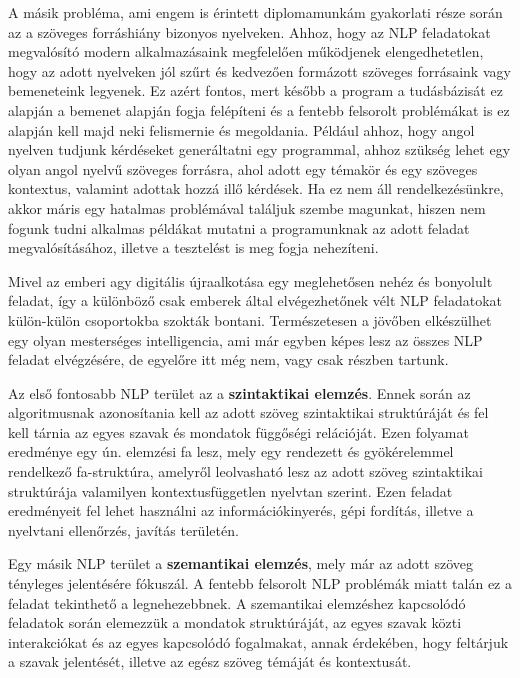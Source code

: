 A másik probléma, ami engem is érintett diplomamunkám gyakorlati része során az a szöveges forráshiány bizonyos nyelveken. Ahhoz, hogy az NLP feladatokat megvalósító modern alkalmazásaink megfelelően működjenek elengedhetetlen, hogy az adott nyelveken jól szűrt és kedvezően formázott szöveges forrásaink vagy bemeneteink legyenek. Ez azért fontos, mert később a program a tudásbázisát ez alapján a bemenet alapján fogja felépíteni és a fentebb felsorolt problémákat is ez alapján kell majd neki felismernie és megoldania. Például ahhoz, hogy angol nyelven tudjunk kérdéseket generáltatni egy programmal, ahhoz szükség lehet egy olyan angol nyelvű szöveges forrásra, ahol adott egy témakör és egy szöveges kontextus, valamint adottak hozzá illő kérdések. Ha ez nem áll rendelkezésünkre, akkor máris egy hatalmas problémával találjuk szembe magunkat, hiszen nem fogunk tudni alkalmas példákat mutatni a programunknak az adott feladat megvalósításához, illetve a tesztelést is meg fogja nehezíteni.


Mivel az emberi agy digitális újraalkotása egy meglehetősen nehéz és bonyolult feladat, így a különböző csak emberek által elvégezhetőnek vélt NLP feladatokat külön-külön csoportokba szokták bontani. Természetesen a jövőben elkészülhet egy olyan mesterséges intelligencia, ami már egyben képes lesz az összes NLP feladat elvégzésére, de egyelőre itt még nem, vagy csak részben tartunk.

Az első fontosabb NLP terület az a \textbf{szintaktikai elemzés}. Ennek során az algoritmusnak azonosítania kell az adott szöveg szintaktikai struktúráját és fel kell tárnia az egyes szavak és mondatok függőségi relációját. Ezen folyamat eredménye egy ún. elemzési fa lesz, mely egy rendezett és gyökérelemmel rendelkező fa-struktúra, amelyről leolvasható lesz az adott szöveg szintaktikai struktúrája valamilyen kontextusfüggetlen nyelvtan szerint. Ezen feladat eredményeit fel lehet használni az információkinyerés, gépi fordítás, illetve a nyelvtani ellenőrzés, javítás területén.

Egy másik NLP terület a \textbf{szemantikai elemzés}, mely már az adott szöveg tényleges jelentésére fókuszál. A fentebb felsorolt NLP problémák miatt talán ez a feladat tekinthető a legnehezebbnek. A szemantikai elemzéshez kapcsolódó feladatok során elemezzük a mondatok struktúráját, az egyes szavak közti interakciókat és az egyes kapcsolódó fogalmakat, annak érdekében, hogy feltárjuk a szavak jelentését, illetve az egész szöveg témáját és kontextusát.